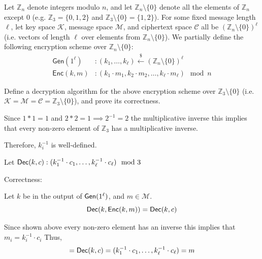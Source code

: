\documentclass[12pt, letterpaper]{article}
\newcommand{\Z}{\mathbb{Z}}
\newcommand{\skcgen}{{\sf Gen}} \newcommand{\skcenc}{{\sf Enc}}
\newcommand{\skcdec}{{\sf Dec}}
\begin{document}
\begin{problem}{}
    Let $\mathbb{Z}_n$ denote integers modulo $n$,
and let $\mathbb{Z}_n \setminus \{0\}$ denote all the elements of $\mathbb{Z}_n$ except $0$ (e.g. $\mathbb{Z}_3 = \{0, 1, 2\}$ and $\mathbb{Z}_3 \setminus \{0\} = \{1, 2\}$). 
For some fixed message length $\ell$,
let key space $\mathcal{K}$, message space $\mathcal{M}$, and ciphertext space $\mathcal{C}$ all be $(\mathbb{Z}_{n} \setminus \{0\})^\ell$ (i.e. vectors of length $\ell$ over elements from $\mathbb{Z}_{n} \setminus \{0\}$).
We partially define the following encryption scheme over $\mathbb{Z}_n \setminus \{0\}$:
\begin{align*}
    \mathsf{Gen}(1^\ell) &: (k_1, \dots, k_\ell) \overset{\$}{\leftarrow} (\mathbb{Z}_{n} \setminus \{0\})^\ell\\
    \mathsf{Enc}(k, m) &: (k_1 \cdot m_1, k_2 \cdot m_2, \dots, k_\ell \cdot m_\ell)\mod n
\end{align*}
\end{problem}

\begin{subproblem}{}
    Define a decryption algorithm for the above encryption scheme over $\mathbb{Z}_3 \setminus \{0\}$
    (i.e. $\mathcal{K} = \mathcal{M} = \mathcal{C} = \mathbb{Z}_{3} \setminus \{0\}$), 
    and prove its correctness.
\end{subproblem}
\begin{solution}
    Since $1*1=1$ and $2*2=1 \implies 2^{-1}=2$ the multiplicative inverse this implies that every non-zero element of $\Z_3$ has a multiplicative inverse.

    \noindent Therefore, $k_i^{-1}$ is well-defined.

    \noindent Let $\skcdec(k,c): (k_1^{-1} \cdot c_1,\dots, k_\ell^{-1} \cdot c_{\ell}) \mod 3$

    \noindent Correctness:

    \noindent Let $k$ be in the output of $\skcgen(1^\ell)$, and $m \in \mathcal{M}$.
    \[\skcdec(k, \skcenc(k,m))=\skcdec(k, c)\]

    \noindent Since shown above every non-zero element has an inverse this implies that $m_i = k_i^{-1} \cdot c_i$ Thus,
    \[=\skcdec(k, c)=(k_1^{-1}\cdot c_1,\dots, k_\ell^{-1} \cdot c_\ell)=m\]
\end{solution}
\end{document}
